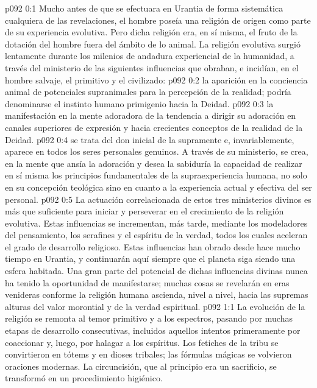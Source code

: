\author{Melquisedec}
\vs p092 0:1 Mucho antes de que se efectuara en Urantia de forma sistemática cualquiera de las revelaciones, el hombre poseía una religión de origen  como parte de su experiencia evolutiva. Pero dicha religión era, en sí misma, el fruto de la dotación del hombre fuera del ámbito de lo animal. La religión evolutiva surgió lentamente durante los milenios de andadura experiencial de la humanidad, a través del ministerio de las siguientes influencias que obraban, e incidían, en el hombre salvaje, el primitivo y el civilizado:
\vs p092 0:2  la aparición en la conciencia animal de potenciales supranimales para la percepción de la realidad; podría denominarse el instinto humano primigenio hacia la Deidad.
\vs p092 0:3  la manifestación en la mente adoradora de la tendencia a dirigir su adoración en canales superiores de expresión y hacia crecientes conceptos de la realidad de la Deidad.
\vs p092 0:4  se trata del don inicial de la supramente e, invariablemente, aparece en todos los seres personales genuinos. A través de su ministerio, se crea, en la mente que ansía la adoración y desea la sabiduría la capacidad de realizar en sí misma los principios fundamentales de la supraexperiencia humana, no solo en su concepción teológica sino en cuanto a la experiencia actual y efectiva del ser personal.
\vs p092 0:5 \pc La actuación correlacionada de estos tres ministerios divinos es más que suficiente para iniciar y perseverar en el crecimiento de la religión evolutiva. Estas influencias se incrementan, más tarde, mediante los modeladores del pensamiento, los serafines y el espíritu de la verdad, todos los cuales aceleran el grado de desarrollo religioso. Estas influencias han obrado desde hace mucho tiempo en Urantia, y continuarán aquí siempre que el planeta siga siendo una esfera habitada. Una gran parte del potencial de dichas influencias divinas nunca ha tenido la oportunidad de manifestarse; muchas cosas se revelarán en eras venideras conforme la religión humana ascienda, nivel a nivel, hacia las supremas alturas del valor morontial y de la verdad espiritual.
\vs p092 1:1 La evolución de la religión se remonta al temor primitivo y a los espectros, pasando por muchas etapas de desarrollo consecutivas, incluidos aquellos intentos primeramente por coaccionar y, luego, por halagar a los espíritus. Los fetiches de la tribu se convirtieron en tótems y en dioses tribales; las fórmulas mágicas se volvieron oraciones modernas. La circuncisión, que al principio era un sacrificio, se transformó en un procedimiento higiénico.
